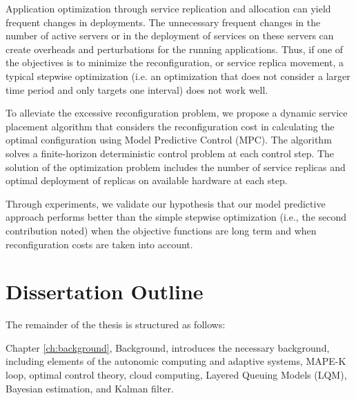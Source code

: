 Application optimization through service replication and allocation can yield frequent changes in deployments.
The unnecessary frequent changes in the number of active servers or in the deployment of services on these servers can create overheads and perturbations for the running applications. 
Thus, if one of the objectives is to minimize the reconfiguration, or service replica movement, a typical stepwise optimization (i.e. an optimization that does not consider a larger time period and only targets one interval) does not work well. 

    To alleviate the excessive reconfiguration problem, we propose a dynamic service placement algorithm that considers the reconfiguration cost in calculating the optimal configuration using Model Predictive Control (MPC). The algorithm solves a finite-horizon deterministic control problem at each control step. The solution of the optimization problem includes the number of service replicas and optimal deployment of replicas on available hardware at each step. 

   Through experiments, we validate our hypothesis that our model predictive approach performs better than the simple stepwise optimization (i.e., the second contribution noted) when the objective functions are long term and when reconfiguration costs are taken into account.

  \section{Dissertation Outline}
 The remainder of the thesis is structured as follows:  

  Chapter \ref{ch:background}, Background, introduces the necessary background, including elements of the autonomic computing and adaptive systems, MAPE-K loop, optimal control theory, cloud computing, Layered Queuing Models (LQM), Bayesian estimation, and Kalman filter. 
	
